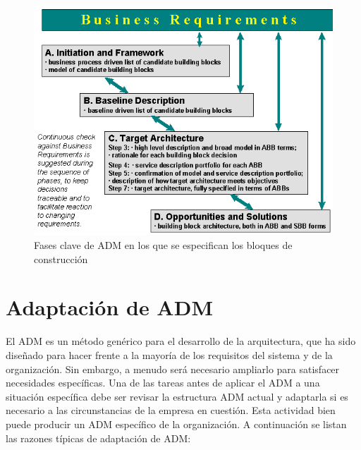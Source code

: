 \begin{figure}[h!]
	\centering
	\includegraphics[width=1\linewidth]{ARQUITECTURA/imgs/bloques}
	\caption{Fases clave de ADM en los que se especifican los bloques de construcción}
	\label{bloques}
\end{figure}

\newpage
\section{Adaptación de ADM}

El ADM es un método genérico para el desarrollo de la arquitectura, que ha sido diseñado para hacer frente a la mayoría de los requisitos del sistema y de la organización. Sin embargo, a menudo será necesario ampliarlo para satisfacer necesidades específicas. Una de las tareas antes de aplicar el ADM a una situación específica debe ser revisar la estructura ADM actual y adaptarla si es necesario a las circunstancias de la empresa en cuestión. Esta actividad bien puede producir un ADM específico de la organización. A continuación se listan las razones típicas de adaptación de ADM:

